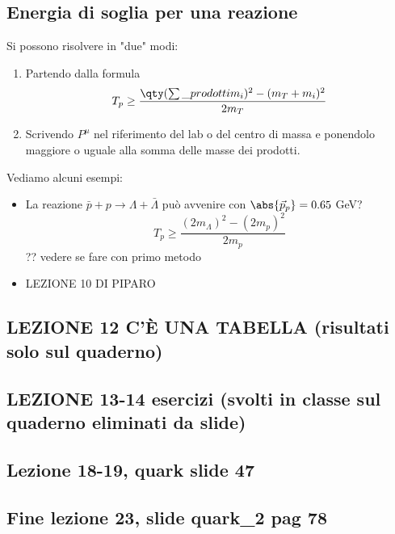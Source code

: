 \subsection{Energia di soglia per una reazione} 
Si possono risolvere in "due" modi:
\begin{enumerate}
    \item Partendo dalla formula 
    \begin{equation*}
    T_p\geq \frac {\qty(\sum\_{prodotti}m_i)^2 - (m_T+m_i)^2} {2m_T}
    \end{equation*}
    \item Scrivendo $P^\mu$ nel riferimento del lab o del centro di massa e ponendolo maggiore o uguale alla somma delle masse dei prodotti.
\end{enumerate}
Vediamo alcuni esempi:
\begin{itemize}
    \item La reazione $\bar p + p\to \Lambda+\bar\Lambda$ può avvenire con $\abs{\vec p_p}=0.65$ GeV? 
    \begin{equation*}
    T_p\geq \frac {(2m_\Lambda)^2-(2m_p)^2} {2m_p}
    \end{equation*} ?? vedere se fare con primo metodo 
    \item LEZIONE 10 DI PIPARO
\end{itemize}
\subsection{LEZIONE 12 C'È UNA TABELLA (risultati solo sul quaderno)}
\subsection{LEZIONE 13-14 esercizi (svolti in classe sul quaderno eliminati da slide)}
\subsection{Lezione 18-19, quark slide 47}
\subsection{Fine lezione 23, slide quark_2 pag 78}